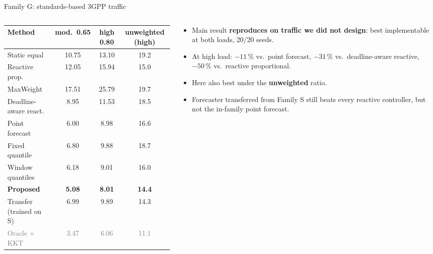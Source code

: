 \documentclass[aspectratio=169,11pt,xcolor=table]{beamer}
\begin{document}
\begin{frame}{Family G: standards-based 3GPP traffic}
  \begin{columns}[T]
    \begin{column}{0.55\textwidth}
      \scriptsize
      \begin{tabular}{lccc}
        \toprule
        Method & mod.\ 0.65 & high 0.80 & unweighted (high) \\
        \midrule
        Static equal & 10.75 & 13.10 & 19.2 \\
        Reactive prop. & 12.05 & 15.94 & 15.0 \\
        MaxWeight & 17.51 & 25.79 & 19.7 \\
        Deadline-aware react. & 8.95 & 11.53 & 18.5 \\
        Point forecast & 6.00 & 8.98 & 16.6 \\
        Fixed quantile & 6.80 & 9.88 & 18.7 \\
        Window quantiles & 6.18 & 9.01 & 16.0 \\
        \rowcolor{good!15}\textbf{Proposed} & \textbf{5.08} & \textbf{8.01} & \textbf{14.4} \\
        Transfer (trained on S) & 6.99 & 9.89 & 14.3 \\
        \midrule
        \textcolor{gray}{Oracle + KKT} & \textcolor{gray}{3.47} & \textcolor{gray}{6.06} & \textcolor{gray}{11.1} \\
        \bottomrule
      \end{tabular}
    \end{column}
    \begin{column}{0.43\textwidth}
      \begin{itemize}\small
        \item Main result \textbf{reproduces on traffic we did not design}: best implementable at both loads, 20/20 seeds.
        \item At high load: $-11$\,\% vs.\ point forecast, $-31$\,\% vs.\ deadline-aware reactive, $-50$\,\% vs.\ reactive proportional.
        \item Here also best under the \textbf{unweighted} ratio.
        \item Forecaster transferred from Family S still beats every reactive controller, but not the in-family point forecast.
      \end{itemize}
    \end{column}
  \end{columns}
\end{frame}
\end{document}

